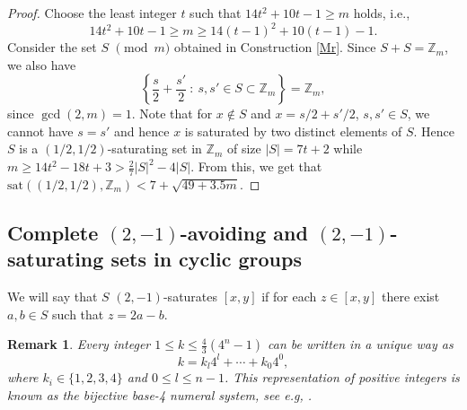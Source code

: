 \documentclass[11pt]{article}
\numberwithin{table}{section}
\newcommand{\sat}{\mathrm{sat}}
\newtheorem{remark}[theorem]{Remark}
\theoremstyle{definition}
\begin{document}
	
	\begin{proof} Choose the least integer $t$ such that $14t^2+10t-1\geq m$ holds, i.e., $$14t^2+10t-1\geq m\ge 14(t-1)^2+10(t-1)-1.$$ Consider the set $S$  $\pmod m$ obtained in Construction \ref{Mr}. Since $S+S= \mathbb{Z}_m$, we also have $$\left\{\frac{s}{2}+\frac{s'}{2} \  : \  s, s'\in S\subset \mathbb{Z}_m\right\}=\mathbb{Z}_m,$$ since $\gcd(2,m)=1$. 
		Note that for $x\notin S$ and $x=s/2+s'/2$, $s,s' \in S$, we cannot have $s=s'$ and hence $x$ is saturated by two distinct elements of $S$. 
		Hence $S$ is a $(1/2, 1/2)$-saturating set in $\mathbb{Z}_m$ of size $|S|=7t+2$ while $m\ge 14t^2-18t+3> \frac{2}{7}|S|^2-4|S|.$ From this, we get that $\sat((1/2, 1/2), \mathbb{Z}_m)< 7+\sqrt{49+3.5m}.$ 
	\end{proof}


	
	\subsection{\texorpdfstring{Complete $(2,-1)$-avoiding and $(2,-1)$-saturating sets in cyclic groups}{Complete (2,-1)-avoiding and (2,-1)-saturating sets in cyclic groups}}
	
	We will say that $S$ $(2,-1)$-saturates $[x,y]$ if for each $z\in [x,y]$ there exist $a,b\in S$ such that $z=2a-b$. 
	
	\begin{remark}
		Every integer $1\leq k  \leq \frac43 (4^{n}-1)$ can be written in a unique way as 
		\[k=k_{l}4^{l}+\cdots +k_0 4^0,\]
		where $k_i\in \{1,2,3,4\}$ and $0 \leq l\leq n-1$. %
		This representation of positive integers is known as the bijective base-4 numeral system, see e.g, \cite{Smullyan}.
	\end{remark}
	
\end{document}
